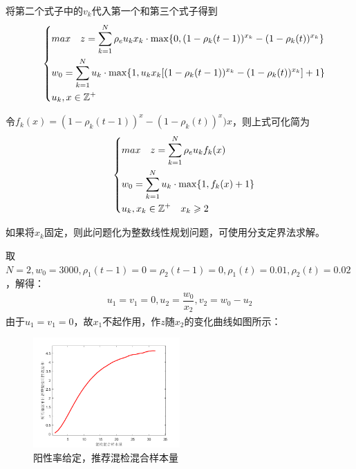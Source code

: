 \documentclass[withoutpreface,bwprint]{cumcmthesis} %
\begin{document}
将第二个式子中的$v_k$代入第一个和第三个式子得到
\begin{align}
\label{eq2solution1}
\quad\left\{
    \begin{aligned}
        &max\quad z = \sum^N_{k=1}\rho_e u_k x_k \cdot {\rm max}
         \{0,(1-\rho_k(t-1))^{x_k}-(1-\rho_k(t))^{x_k} \}   \\
        &w_0 = \sum^N_{k=1} u_k\cdot {\rm max} \{1, u_k x_k  [(1-\rho_k(t-1))^{x_k}-(1-\rho_k(t))^{x_k}] +1 \} \\
        &u_k,x\in\mathbb{Z^+}\\
    \end{aligned}
    \right.
\end{align}

令$f_k(x) = (1-\rho_k(t-1))^x-(1-\rho_k(t))^x)x$，则上式可化简为
\begin{align}
\label{eq2solution1}
\quad\left\{
    \begin{aligned}
        &max\quad z = \sum^N_{k=1}\rho_e u_k f_k(x)  \\
        &w_0 = \sum^N_{k=1} u_k \cdot {\rm max}\{1,f_k(x)+1\}  \\
        &u_k,x_k\in\mathbb{Z^+} \quad x_k \geqslant 2 \\
    \end{aligned}
    \right.
\end{align}

如果将$x_k$固定，则此问题化为整数线性规划问题，可使用分支定界法求解\cite{bib20}。

取$N=2,w_0=3000,\rho_1(t-1)=0=\rho_2(t-1)=0,\rho_1(t)=0.01,\rho_2(t)=0.02$，解得：
\begin{align*}
    u_1=v_1=0, u_2=\dfrac{w_0}{x_2},v_2=w_0-u_2
\end{align*}
由于$u_1=v_1=0$，故$x_1$不起作用，作$z$随$x_2$的变化曲线如图所示：
\begin{figure}[H]
\centering
\includegraphics[width=0.5\textwidth]{fig_pro3.png}
\caption{阳性率给定，推荐混检混合样本量}
\label{pro1}
\end{figure}
\end{document}
